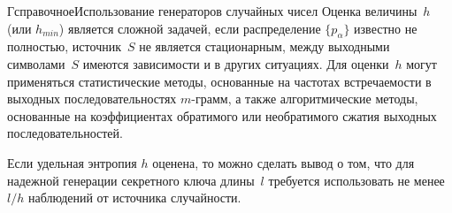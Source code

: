 \begin{appendix}{Г}{справочное}{Использование генераторов случайных чисел}
Оценка величины~$h$ (или $h_{min}$) является сложной задачей, 
если распределение $\{p_\alpha\}$ известно не полностью,
источник~$S$ не является стационарным,
между выходными символами~$S$ имеются зависимости и в других ситуациях.
%
Для оценки~$h$ могут применяться статистические методы,
основанные на частотах встречаемости в выходных последовательностях
$m$-грамм, а также алгоритмические методы, основанные на коэффициентах 
обратимого или необратимого сжатия выходных 
последовательностей.

Если удельная энтропия $h$ оценена, то можно сделать вывод о том, что для 
надежной генерации секретного ключа длины~$l$ требуется использовать 
не менее $l/h$ наблюдений от источника случайности.

\end{appendix}
